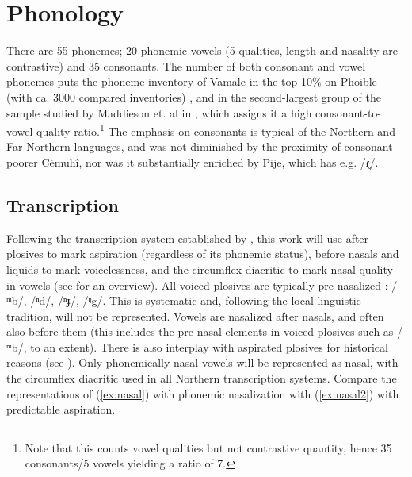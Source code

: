 \chapter{Phonology}
\label{ChapterPhon}
	
There are 55 phonemes; 20 phonemic vowels (5 qualities, length and nasality are contrastive) and 35 consonants. The number of both consonant and vowel phonemes puts the phoneme inventory of Vamale in the top 10\% on Phoible (with ca. 3000 compared inventories) \parencite{phoible}, and in the second-largest group of the sample studied by Maddieson et. al in , which assigns it a high consonant-to-vowel quality ratio.\footnote{Note that this counts vowel qualities but not contrastive quantity, hence 35 consonants\slash 5 vowels  yielding a ratio of 7.}
The emphasis on consonants is typical of the Northern and Far Northern languages, and was not diminished by the proximity of consonant-poorer Cèmuhî, nor was it substantially enriched by Pije, which has e.g. /ɾ̥/.
	
	
\section{Transcription}
Following the transcription system established by \textcite{ozanne-rivierre_phonologie_1982}%
, this work will use  after plosives to mark aspiration (regardless of its phonemic status),  before nasals and liquids to mark voicelessness, and the circumflex diacritic to mark nasal quality in vowels (see  for an overview). All voiced plosives are typically pre-nasalized%
: /ᵐb/, /ⁿd/, /ⁿɟ/, /ᵑg/. This is systematic and, following the local linguistic tradition, will not be represented. Vowels are nasalized after nasals, and often also before them (this includes the pre-nasal elements in voiced plosives such as /ᵐb/, to an extent). There is also interplay with aspirated plosives for historical reasons  (see ). Only phonemically nasal vowels will be represented as nasal, with the circumflex diacritic \ort{\^{}} used in all Northern transcription systems. Compare the representations of (\ref{ex:nasal}) with phonemic nasalization with (\ref{ex:nasal2}) with predictable aspiration.
	
